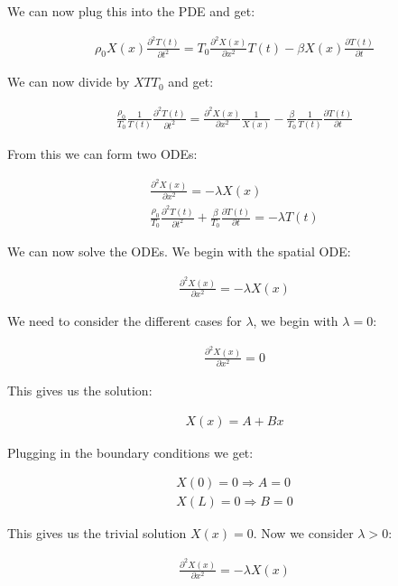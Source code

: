 \documentclass[a4paper]{article}
\begin{document}
We can now plug this into the PDE and get:

\begin{align*}
    \rho_0 X(x) \frac{\partial^2 T(t)}{\partial t^2} = T_0 \frac{\partial^2 X(x)}{\partial x^2}T(t) - \beta X(x) \frac{\partial T(t)}{\partial t}
\end{align*}

We can now divide by $XTT_0$ and get:

\begin{align*}
    \frac{\rho_0}{T_0} \frac{1}{T(t)} \frac{\partial^2 T(t)}{\partial t^2} = \frac{\partial^2 X(x)}{\partial x^2}\frac{1}{X(x)} - \frac{\beta}{T_0} \frac{1}{T(t)} \frac{\partial T(t)}{\partial t}
\end{align*}

From this we can form two ODEs:

\begin{align*}
    \frac{\partial^2 X(x)}{\partial x^2} = -\lambda X(x) \\
    \frac{\rho_0}{T_0} \frac{\partial^2 T(t)}{\partial t^2} + \frac{\beta}{T_0} \frac{\partial T(t)}{\partial t} = -\lambda T(t)
\end{align*}

We can now solve the ODEs. We begin with the spatial ODE:

\begin{align*}
    \frac{\partial^2 X(x)}{\partial x^2} = -\lambda X(x)
\end{align*}

We need to consider the different cases for $\lambda$, we begin with $\lambda = 0$:

\begin{align*}
    \frac{\partial^2 X(x)}{\partial x^2} = 0
\end{align*}

This gives us the solution:

\begin{align*}
    X(x) = A + Bx
\end{align*}

Plugging in the boundary conditions we get:

\begin{align*}
    X(0) = 0 \Rightarrow A = 0 \\
    X(L) = 0 \Rightarrow B = 0
\end{align*}

This gives us the trivial solution $X(x) = 0$. Now we consider $\lambda > 0$:

\begin{align*}
    \frac{\partial^2 X(x)}{\partial x^2} = -\lambda X(x)
\end{align*}
\end{document}
